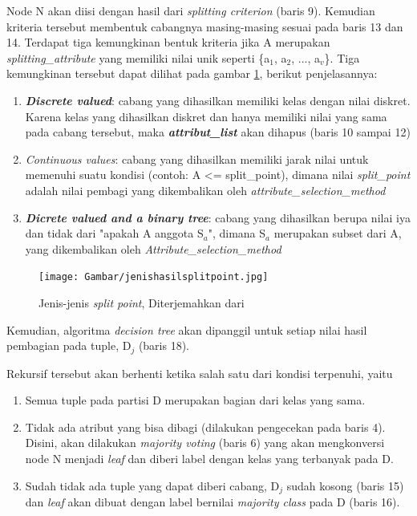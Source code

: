 Node N akan diisi dengan hasil dari \textsl{splitting criterion} (baris 9). Kemudian kriteria tersebut membentuk cabangnya masing-masing sesuai pada baris 13 dan 14. Terdapat tiga kemungkinan bentuk kriteria jika A merupakan \textsl{splitting\_attribute} yang memiliki nilai unik seperti \{a$_{1}$, a$_{2}$, ..., a$_{v}$\}. Tiga kemungkinan tersebut dapat dilihat pada gambar \ref{fig:splitPoint}, berikut penjelasannya:

\begin{enumerate}
	\item \textbf{\textsl{Discrete valued}}: cabang yang dihasilkan memiliki kelas dengan nilai diskret. Karena kelas yang dihasilkan diskret dan hanya memiliki nilai yang sama pada cabang tersebut, maka \textbf{\textsl{attribut\_list}} akan dihapus (baris 10 sampai 12)
	\item \textsl{Continuous values}: cabang yang dihasilkan memiliki jarak nilai untuk memenuhi suatu kondisi (contoh: A <= split\_point), dimana nilai \textsl{split\_point} adalah nilai pembagi yang dikembalikan oleh \textsl{attribute\_selection\_method}
	\item \textbf{\textsl{Dicrete valued and a binary tree}}: cabang yang dihasilkan berupa nilai iya dan tidak dari "apakah A anggota S$_{a}$", dimana S$_{a}$ merupakan subset dari A, yang dikembalikan oleh \textsl{Attribute\_selection\_method}
\end{enumerate}


\begin{figure}
\centering
\texttt{[image: Gambar/jenishasilsplitpoint.jpg]}
\caption[Jenis-jenis \textsl{split point}]{Jenis-jenis \textsl{split point}, Diterjemahkan dari \cite{DM}} 
\label{fig:splitPoint}
\end{figure}

Kemudian, algoritma \textsl{decision tree} akan dipanggil untuk setiap nilai hasil pembagian pada tuple, D$_{j}$  (baris 18).

Rekursif tersebut akan berhenti ketika salah satu dari kondisi terpenuhi, yaitu

\begin{enumerate}
	\item Semua tuple pada partisi D merupakan bagian dari kelas yang sama.
	\item Tidak ada atribut yang bisa dibagi (dilakukan pengecekan pada baris 4). Disini, akan dilakukan \textsl{majority voting} (baris 6) yang akan mengkonversi node N menjadi \textsl{leaf} dan diberi label dengan kelas yang terbanyak pada D.
	\item Sudah tidak ada tuple yang dapat diberi cabang, D$_{j}$ sudah kosong (baris 15) dan \textsl{leaf} akan dibuat dengan label bernilai \textsl{majority class} pada D (baris 16).
\end{enumerate}

